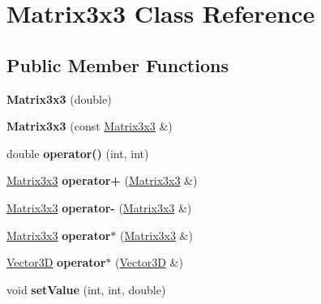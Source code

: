 \hypertarget{class_matrix3x3}{}\section{Matrix3x3 Class Reference}
\label{class_matrix3x3}
\subsection*{Public Member Functions}
\begin{DoxyCompactItemize}
\item 
{\bfseries Matrix3x3} (double)\hypertarget{class_matrix3x3_a70ca799597247a19e8285f883c539366}{}\label{class_matrix3x3_a70ca799597247a19e8285f883c539366}

\item 
{\bfseries Matrix3x3} (const \hyperlink{class_matrix3x3}{Matrix3x3} \&)\hypertarget{class_matrix3x3_a1604c4113e3173740aaf284d4a798b92}{}\label{class_matrix3x3_a1604c4113e3173740aaf284d4a798b92}

\item 
double {\bfseries operator()} (int, int)\hypertarget{class_matrix3x3_a93eb28c963637058fd3da9201e93cea8}{}\label{class_matrix3x3_a93eb28c963637058fd3da9201e93cea8}

\item 
\hyperlink{class_matrix3x3}{Matrix3x3} {\bfseries operator+} (\hyperlink{class_matrix3x3}{Matrix3x3} \&)\hypertarget{class_matrix3x3_a458cb354acf25d9f4dd0f038afd48a6b}{}\label{class_matrix3x3_a458cb354acf25d9f4dd0f038afd48a6b}

\item 
\hyperlink{class_matrix3x3}{Matrix3x3} {\bfseries operator-\/} (\hyperlink{class_matrix3x3}{Matrix3x3} \&)\hypertarget{class_matrix3x3_ad6097601c5d9779505cc1bb96a53fd8a}{}\label{class_matrix3x3_ad6097601c5d9779505cc1bb96a53fd8a}

\item 
\hyperlink{class_matrix3x3}{Matrix3x3} {\bfseries operator$\ast$} (\hyperlink{class_matrix3x3}{Matrix3x3} \&)\hypertarget{class_matrix3x3_ac973064b3cd3d4115e719a7eec3e4ae3}{}\label{class_matrix3x3_ac973064b3cd3d4115e719a7eec3e4ae3}

\item 
\hyperlink{class_vector3_d}{Vector3D} {\bfseries operator$\ast$} (\hyperlink{class_vector3_d}{Vector3D} \&)\hypertarget{class_matrix3x3_a754dc9a5e7c88d6d4d00f028f248d77a}{}\label{class_matrix3x3_a754dc9a5e7c88d6d4d00f028f248d77a}

\item 
void {\bfseries set\+Value} (int, int, double)\hypertarget{class_matrix3x3_a139eaa4d6a29aee712456f2156367406}{}\label{class_matrix3x3_a139eaa4d6a29aee712456f2156367406}


\end{DoxyCompactItemize}
